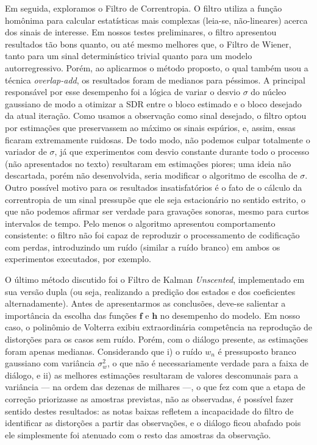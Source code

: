 Em seguida, exploramos o Filtro de Correntropia. O filtro utiliza a função homônima para calcular estatísticas mais complexas (leia-se, não-lineares) acerca dos sinais de interesse. Em nossos testes preliminares, o filtro apresentou resultados tão bons quanto, ou até mesmo melhores que, o Filtro de Wiener, tanto para um sinal determinístico trivial quanto para um modelo autorregressivo. Porém, ao aplicarmos o método proposto, o qual também usou a técnica \textit{overlap-add}, os resultados foram de medianos para péssimos. A principal responsável por esse desempenho foi a lógica de variar o desvio $\sigma$ do núcleo gaussiano de modo a otimizar a SDR entre o bloco estimado e o bloco desejado da atual iteração. Como usamos a observação como sinal desejado, o filtro optou por estimações que preservassem ao máximo os sinais espúrios, e, assim, essas ficaram extremamente ruidosas. De todo modo, não podemos culpar totalmente o variador de $\sigma$, já que experimentos com desvio constante durante todo o processo (não apresentados no texto) resultaram em estimações piores; uma ideia não descartada, porém não desenvolvida, seria modificar o algoritmo de escolha de $\sigma$. Outro possível motivo para os resultados insatisfatórios é o fato de o cálculo da correntropia de um sinal pressupõe que ele seja estacionário no sentido estrito, o que não podemos afirmar ser verdade para gravações sonoras, mesmo para curtos intervalos de tempo. Pelo menos o algoritmo apresentou comportamento consistente: o filtro não foi capaz de reproduzir o processamento de codificação com perdas, introduzindo um ruído (similar a ruído branco) em ambos os experimentos executados, por exemplo.

O último método discutido foi o Filtro de Kalman \textit{Unscented}, implementado em sua versão dupla (ou seja, realizando a predição dos estados e dos coeficientes alternadamente). Antes de apresentarmos as conclusões, deve-se salientar a importância da escolha das funções $\mathbf{f}$ e $\mathbf{h}$ no desempenho do modelo. Em nosso caso, o polinômio de Volterra exibiu extraordinária competência na reprodução de distorções para os casos sem ruído. Porém, com o diálogo presente, as estimações foram apenas medianas. Considerando que i) o ruído $w_n$ é pressuposto branco gaussiano com variância $\sigma_{w}^2$, o que não é necessariamente verdade para a faixa de diálogo, e ii) as melhores estimações resultaram de valores descomunais para a variância --- na ordem das dezenas de milhares ---, o que fez com que a etapa de correção priorizasse as amostras previstas, não as observadas, é possível fazer sentido destes resultados: as notas baixas refletem a incapacidade do filtro de identificar as distorções a partir das observações, e o diálogo ficou abafado pois ele simplesmente foi atenuado com o resto das amostras da observação.

